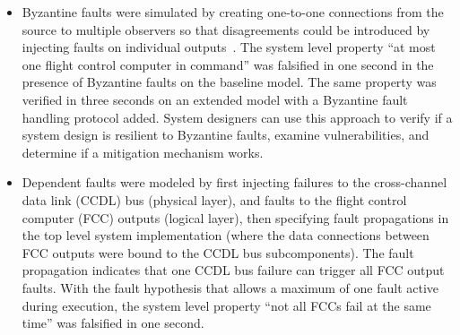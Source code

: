 \begin{itemize}
	\item Byzantine faults were simulated by creating one-to-one connections from the source to multiple observers so that disagreements could be introduced by injecting faults on individual outputs~\cite{Driscoll-Byzantine-Fault}. The system level property ``at most one flight control computer in command'' was falsified in one second in the presence of Byzantine faults on the baseline model. The same property was verified in three seconds on an extended model with a Byzantine fault handling protocol added.  System designers can use this approach to verify if a system design is resilient to Byzantine faults, examine vulnerabilities, and determine if a mitigation mechanism works.
	
	\item Dependent faults were modeled by first injecting failures to the cross-channel data link (CCDL) bus (physical layer), and faults to the flight control computer (FCC) outputs (logical layer), then specifying fault propagations in the top level system implementation (where the data connections between FCC outputs were bound to the CCDL bus subcomponents). The fault propagation indicates that one CCDL bus failure can trigger all FCC output faults. With the fault hypothesis that allows a maximum of one fault active during execution, the system level property ``not all FCCs fail at the same time'' was falsified in one second.
	
	
\end{itemize}
\newpage
